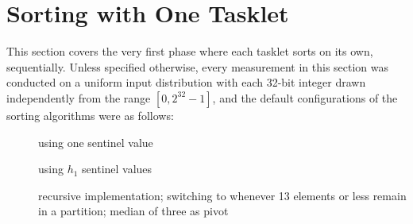 \section{Sorting with One Tasklet}

This section covers the very first phase where each tasklet sorts on its own, \ie{} sequentially.
Unless specified otherwise, every measurement in this section was conducted on a uniform input distribution with each 32-bit integer drawn independently from the range \([0, 2^{32} - 1]\), and the default configurations of the sorting algorithms were as follows:
\begin{description}
	\item[\IS{}]
	using one sentinel value

	\item[\ShS{}]
	using \(h_1\) sentinel values

	\item[\QS{}]
	recursive implementation;
	switching to \IS{} whenever 13 elements or less remain in a partition;
	median of three as pivot
\end{description}




